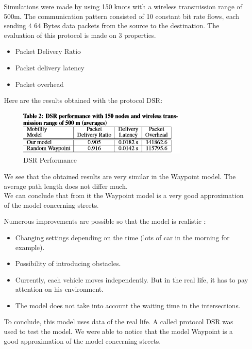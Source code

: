 Simulations were made by using 150 knots with a wireless transmission range of 500m. The communication  pattern  consisted of 10 constant bit rate flows, each sending 4 64 Bytes data packets from the source to the destination.
The evaluation of this protocol is made on 3 properties.
\begin{itemize}
\item Packet Delivery Ratio
\item Packet delivery latency
\item Packet overhead
\end{itemize}

Here are the results obtained with the protocol DSR:\\

\begin{figure}[h]
\center
\includegraphics{../images/protocoleDSR.png}
\caption{\label{ProtDSR}DSR Performance}
\end{figure}

We see that the obtained results are very similar in the Waypoint model. The average path length does not differ much.\\
We can conclude that from it the Waypoint model is a very good approximation of the model concerning streets.

Numerous improvements are possible so that the model is realistic :

\begin{itemize}
\item Changing settings depending on the time (lots of car in the morning for example).
\item Possibility of introducing obstacles.
\item Currently, each vehicle moves independently. But in the real life, it has to pay attention on his environment.
\item The model does not take into account the waiting time in the intersections.
\end{itemize}

To conclude, this model uses data of the real life. A called protocol DSR was used to test the model. We were able to notice that the model Waypoint is a good approximation of the model concerning streets.



